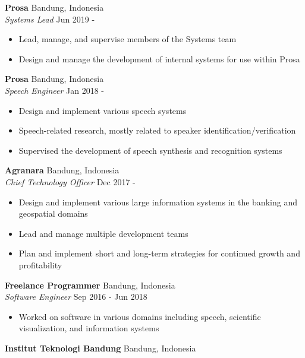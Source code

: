 \documentclass[a4paper]{article}
\begin{document}
\textbf{Prosa} \hfill Bandung, Indonesia\\
\textit{Systems Lead} \hfill Jun 2019 -\\
\vspace{-3mm}
\begin{itemize} \itemsep 1pt
  \item Lead, manage, and supervise members of the Systems team
  \item Design and manage the development of internal systems for use
    within Prosa
\end{itemize}
\textbf{Prosa} \hfill Bandung, Indonesia\\
\textit{Speech Engineer} \hfill Jan 2018 -\\
\vspace{-3mm}
\begin{itemize} \itemsep 1pt
  \item Design and implement various speech systems
  \item Speech-related research, mostly related to speaker
    identification/verification
  \item Supervised the development of speech synthesis and recognition systems
\end{itemize}
\textbf{Agranara} \hfill Bandung, Indonesia\\
\textit{Chief Technology Officer} \hfill Dec 2017 -\\
\vspace{-3mm}
\begin{itemize} \itemsep 1pt
	\item Design and implement various large information systems in the banking
    and geospatial domains
  \item Lead and manage multiple development teams
  \item Plan and implement short and long-term strategies for continued growth and
    profitability
\end{itemize}
\textbf{Freelance Programmer} \hfill Bandung, Indonesia\\
\textit{Software Engineer} \hfill Sep 2016 - Jun 2018\\
\vspace{-3mm}
\begin{itemize} \itemsep 1pt
	\item Worked on software in various domains including speech, scientific
    visualization, and information systems
\end{itemize}
\textbf{Institut Teknologi Bandung} \hfill Bandung, Indonesia\\
\end{document}
